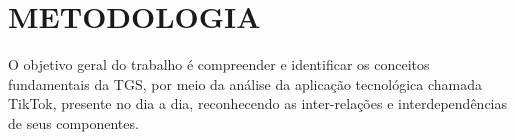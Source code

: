\section{METODOLOGIA}



O objetivo geral do trabalho é compreender e identificar os conceitos fundamentais da TGS, por meio da análise da aplicação tecnológica chamada TikTok, presente no dia a dia, reconhecendo as inter-relações e interdependências de seus componentes.